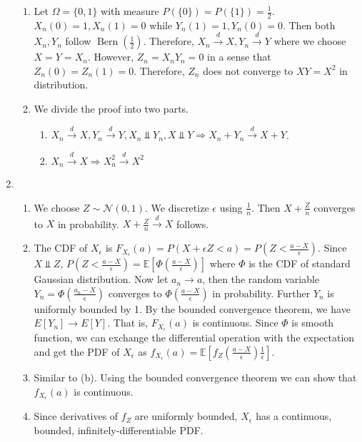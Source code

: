 \documentclass{article}
\DeclareMathOperator{\Bern}{Bern}
\begin{document}
\begin{enumerate}
\begin{enumerate}
    \item Let $\Omega=\{0,1\}$ with measure $P(\{0\})=P(\{1\})=\frac{1}{2}$.
    $X_n(0)=1, X_n(1)=0$ while $Y_n(1)=1, Y_n(0)=0$. Then both $X_n, Y_n$
    follow $\Bern(\frac{1}{2})$. Therefore, $X_n \xrightarrow{d} X,
    Y_n \xrightarrow{d} Y$ where we choose $X=Y=X_n$.
    However, $Z_n = X_n Y_n = 0$ in a sense that $Z_n(0)=Z_n(1)=0$.
    Therefore, $Z_n$ does not converge to $XY=X^2$ in distribution.
    \item We divide the proof into two parts.
    \begin{enumerate}
        \item  $X_n \xrightarrow{d} X, Y_n \xrightarrow{d} Y,
        X_n \Perp Y_n, X \Perp Y\Rightarrow X_n + Y_n \xrightarrow{d} X+Y$.
        \item  $X_n \xrightarrow{d} X \Rightarrow
        X^2_n \xrightarrow{d} X^2
        $
    \end{enumerate}
\end{enumerate}
\item
\begin{enumerate}
    \item We choose $Z \sim \mathcal{N}(0,1)$. We discretize
    $\epsilon$ using $\frac{1}{n}$. Then $X + \frac{Z}{n}$
    converges to $X$ in probability. $X + \frac{Z}{n} \xrightarrow{d} X$ follows.
    \item The CDF of $X_{\epsilon}$ is $F_{X_\epsilon}(a)
    =P(X+\epsilon Z<a)=P(Z<\frac{a-X}{\epsilon})$. Since
    $X \Perp Z$, $P(Z<\frac{a-X}{\epsilon})=\mathbb{E}[\Phi(\frac{a-X}{\epsilon})]$ where $\Phi$ is the CDF of standard Gaussian
    distribution. Now let $a_n \to a$, then the random
    variable $Y_n = \Phi(\frac{a_n-X}{\epsilon})$ converges
    to $\Phi(\frac{a-X}{\epsilon})$ in probability.
    Further $Y_n$ is uniformly bounded by 1.
    By the bounded convergence theorem, we have
    $E[Y_n] \to E[Y]$. That is, $F_{X_\epsilon}(a)$
    is continuous. Since $\Phi$ is smooth function,
    we can exchange the differential operation with
    the expectation and get the PDF of $X_{\epsilon}$
    as
    $f_{X_{\epsilon}}(a) = \mathbb{E}[f_{Z}(\frac{a-X}{\epsilon})\frac{1}{\epsilon}]$.
    \item Similar to (b). Using the bounded convergence theorem
    we can show that $f_{X_{\epsilon}}(a) $
    is continuous.
    \item Since derivatives of $f_{Z}$ are uniformly
    bounded, $X_{\epsilon}$ has a continuous,
    bounded, infinitely-differentiable PDF.
    \end{enumerate} 

\end{enumerate}
\end{document}
